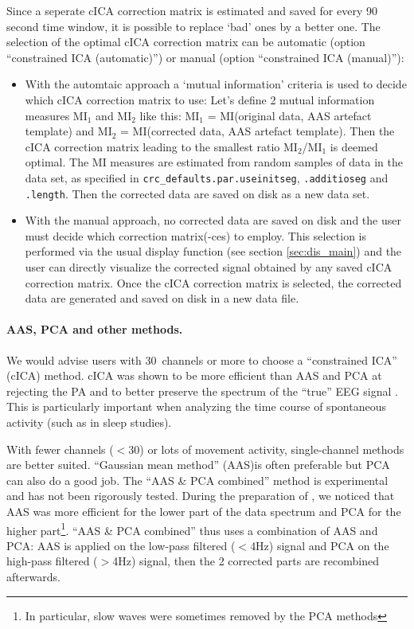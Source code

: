 \documentclass[a4paper,titlepage]{article}
\newcommand{\bi}{\begin{itemize}}
\newcommand{\ei}{\end{itemize}}
\begin{document}
Since a seperate cICA correction matrix is estimated and saved for every 90 second time window, it is possible to replace `bad' ones by a better one. The selection of the optimal cICA correction matrix can be automatic (option ``constrained ICA (automatic)'') or manual (option ``constrained ICA (manual)''):
\bi
\item With the automtaic approach a `mutual information'\cite{Peng2005} criteria is used to decide which cICA correction matrix to use: Let's define 2 mutual information measures MI$_1$ and MI$_2$ like this: MI$_1$ = MI(original data, AAS artefact template) and MI$_2$ = MI(corrected data, AAS artefact template). Then the cICA correction matrix leading to the smallest ratio MI$_2$/MI$_1$ is deemed optimal. The MI measures are estimated from random samples of data in the data set, as specified in {\tt crc\_defaults.par.useinitseg}, {\tt .additioseg} and {\tt .length}. Then the corrected data are saved on disk as a new data set. 
\item With the manual approach, no corrected data are saved on disk and the user must decide which correction matrix(-ces) to employ. This selection is performed via the usual display function (see section \ref{sec:dis_main}) and the user can directly visualize the corrected signal obtained by any saved cICA correction matrix. Once the cICA correction matrix is selected, the corrected data are generated and saved on disk in a new data file.
\ei

\paragraph{AAS, PCA and other methods.}
We would advise users with 30~channels or more to choose a ``constrained ICA'' (cICA) method. cICA was shown to be more efficient than AAS and PCA at rejecting the PA and to better preserve the spectrum of the ``true'' EEG signal \cite{Leclercq2009}. This is particularly important when analyzing the time course of spontaneous activity (such as in sleep studies). 

With fewer channels ($<$30) or lots of movement activity, single-channel methods are better suited. ``Gaussian mean method'' (AAS)is often preferable but PCA can also do a good job. 
The ``AAS \& PCA combined'' method is experimental and has not been rigorously tested. During the preparation of \cite{Leclercq2009}, we noticed that AAS was more efficient for the lower part of the data spectrum and PCA for the higher part\footnote{In particular, slow waves were sometimes removed by the PCA methods}. ``AAS \& PCA combined'' thus uses a combination of AAS and PCA: AAS is applied on the low-pass filtered ($<$4Hz) signal and PCA on the high-pass filtered ($>$4Hz) signal, then the 2 corrected parts are recombined afterwards.
\end{document}
